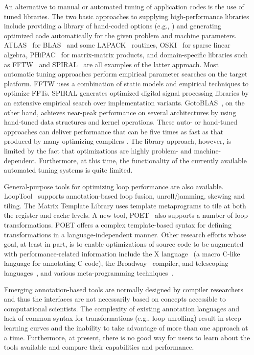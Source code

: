 An alternative to manual or automated tuning of application codes is
the use of tuned libraries. The two basic approaches to supplying
high-performance libraries include providing a library of hand-coded
options (e.g., \cite{BLAS,ESSL,Goto:2006fk}) and generating optimized
code automatically for the given problem and machine
parameters. ATLAS~\cite{atlas_sc98,WN147} for BLAS~\cite{BLAS} and
some LAPACK~\cite{laug} routines, OSKI~\cite{OSKI} for sparse linear
algebra, PHiPAC~\cite{bilmes97optimizing} for matrix-matrix products,
and domain-specific libraries such as FFTW~\cite{frigo98} and
SPIRAL~\cite{SPIRAL} are all examples of the latter approach. Most
automatic tuning approaches perform empirical parameter searches on
the target platform.  FFTW uses a combination of static models and
empirical techniques to optimize FFTs. SPIRAL generates optimized
digital signal processing libraries by an extensive empirical search
over implementation variants.  GotoBLAS~\cite{Goto:2006fk,Goto:fk}, on
the other hand, achieves near-peak performance on several
architectures by using hand-tuned data structures and kernel
operations.  These auto- or hand-tuned approaches can deliver
performance that can be five times as fast as that produced by many
optimizing compilers
\cite{WN147}.  The library approach, however, is limited by the fact
that optimizations are highly problem- and
machine-dependent. Furthermore, at this time, the functionality of the
currently available automated tuning systems is quite limited.


General-purpose tools for optimizing loop performance are also
available.  LoopTool~\cite{LoopTool} supports annotation-based loop
fusion, unroll/jamming, skewing and tiling.  The Matrix Template
Library \cite{Siek:1998ys} uses template metaprograms to tile at both
the register and cache levels.  A new tool, POET~\cite{POET} also
supports a number of loop transformations. POET offers a complex
template-based syntax for defining transformations in a
language-independent manner. Other research efforts whose goal, at
least in part, is to enable optimizations of source code to be
augmented with performance-related information include the X
language~\cite{XLanguage} (a macro C-like language for annotating C
code), the Broadway~\cite{broadway} compiler, and telescoping
languages~\cite{telescopingurl,teleoverview,Ken99}, and various
meta-programming
techniques~\cite{veldhuizen95,weise93,kiczales91,chiba95}.

Emerging annotation-based tools are normally designed by compiler researchers
and thus the interfaces are not necessarily based on concepts accessible to
computational scientists. The complexity of existing annotation languages and lack
of common syntax for transformations (e.g., loop unrolling) result
in steep learning curves and the inability to take advantage of more than one
approach at a time. Furthermore, at present, there is no good way for
users to learn about the tools available and compare their
capabilities and performance.

